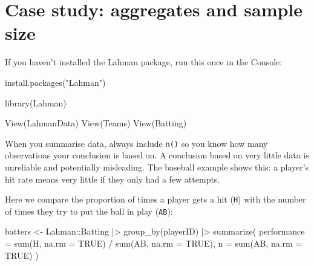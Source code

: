 \documentclass[
  letterpaper,
  DIV=11,
  numbers=noendperiod]{scrreprt}
\newenvironment{Shaded}{\begin{snugshade}}{\end{snugshade}}
\newcommand{\AttributeTok}[1]{\textcolor[rgb]{0.40,0.45,0.13}{#1}}
\newcommand{\ConstantTok}[1]{\textcolor[rgb]{0.56,0.35,0.01}{#1}}
\newcommand{\FunctionTok}[1]{\textcolor[rgb]{0.28,0.35,0.67}{#1}}
\newcommand{\NormalTok}[1]{\textcolor[rgb]{0.00,0.23,0.31}{#1}}
\newcommand{\OtherTok}[1]{\textcolor[rgb]{0.00,0.23,0.31}{#1}}
\newcommand{\SpecialCharTok}[1]{\textcolor[rgb]{0.37,0.37,0.37}{#1}}
\newcommand{\StringTok}[1]{\textcolor[rgb]{0.13,0.47,0.30}{#1}}
\begin{document}
\section{Case study: aggregates and sample
size}\label{case-study-aggregates-and-sample-size}

If you haven't installed the Lahman package, run this once in the
Console:

\begin{Shaded}
\begin{Highlighting}[]
\FunctionTok{install.packages}\NormalTok{(}\StringTok{"Lahman"}\NormalTok{)}
\end{Highlighting}
\end{Shaded}

\begin{Shaded}
\begin{Highlighting}[]
\FunctionTok{library}\NormalTok{(Lahman)}
\end{Highlighting}
\end{Shaded}

\begin{Shaded}
\begin{Highlighting}[]
\FunctionTok{View}\NormalTok{(LahmanData)}
\FunctionTok{View}\NormalTok{(Teams)}
\FunctionTok{View}\NormalTok{(Batting)}
\end{Highlighting}
\end{Shaded}

When you summarise data, always include \texttt{n()} so you know how
many observations your conclusion is based on. A conclusion based on
very little data is unreliable and potentially misleading. The baseball
example shows this: a player's hit rate means very little if they only
had a few attempts.

Here we compare the proportion of times a player gets a hit (\texttt{H})
with the number of times they try to put the ball in play (\texttt{AB}):

\begin{Shaded}
\begin{Highlighting}[]
\NormalTok{batters }\OtherTok{\textless{}{-}}\NormalTok{ Lahman}\SpecialCharTok{::}\NormalTok{Batting }\SpecialCharTok{|\textgreater{}}
  \FunctionTok{group\_by}\NormalTok{(playerID) }\SpecialCharTok{|\textgreater{}}
  \FunctionTok{summarize}\NormalTok{(}
    \AttributeTok{performance =} \FunctionTok{sum}\NormalTok{(H, }\AttributeTok{na.rm =} \ConstantTok{TRUE}\NormalTok{) }\SpecialCharTok{/} \FunctionTok{sum}\NormalTok{(AB, }\AttributeTok{na.rm =} \ConstantTok{TRUE}\NormalTok{),}
    \AttributeTok{n =} \FunctionTok{sum}\NormalTok{(AB, }\AttributeTok{na.rm =} \ConstantTok{TRUE}\NormalTok{)}
\NormalTok{  )}
\end{Highlighting}
\end{Shaded}
\end{document}
